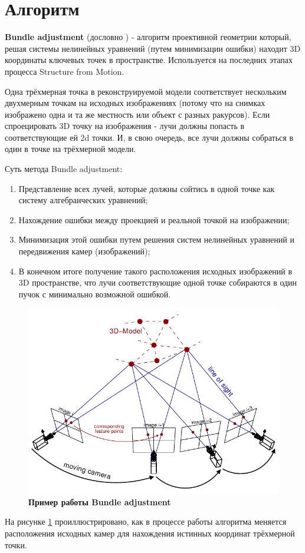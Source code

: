 \section{Алгоритм }

\textbf{Bundle adjustment} (дословно ) - алгоритм проективной геометрии который, решая системы нелинейных уравнений (путем минимизации ошибки) находит 3D координаты ключевых точек в пространстве. Используется на последних этапах процесса Structure from Motion.
 
Одна трёхмерная точка в реконструируемой модели соответствует нескольким двухмерным точкам на исходных изображениях (потому что на снимках изображено одна и та же местность или объект с разных ракурсов). Если спроецировать 3D точку на изображения - лучи должны попасть в соответствующие ей 2d точки. И, в свою очередь, все лучи должны собраться в один  в точке на трёхмерной модели.

\vspace{1em}
Суть метода Bundle adjustment:
\begin{enumerate}
    \item Представление всех лучей, которые должны сойтись в одной точке как систему алгебраических уравнений;
    \item Нахождение ошибки между проекцией и реальной точкой на изображении;
    \item Минимизация этой ошибки путем решения систем нелинейных уравнений и передвижения камер (изображений);
    \item В конечном итоге получение такого расположения исходных изображений в 3D пространстве, что лучи соответствующие одной точке собираются в один пучок с минимально возможной ошибкой.
\end{enumerate}

\begin{figure}[h]
    \centering
    \includegraphics[width=1\textwidth]{images/bundle_adjustment.png}
    \caption{\textbf{Пример работы Bundle adjustment}}
    \label{fig:ba}
\end{figure}

\vspace{1em}
На рисунке \ref{fig:ba} проиллюстрировано, как в процессе работы алгоритма меняется расположения исходных камер для нахождения истинных координат трёхмерной точки.

